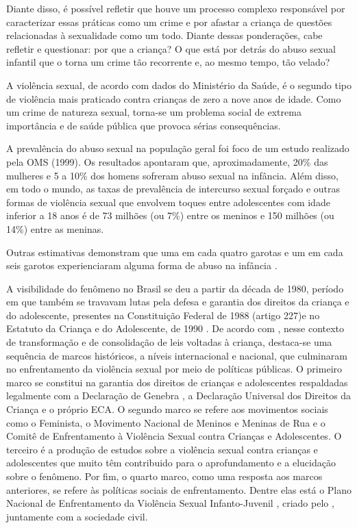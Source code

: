 Diante disso, é possível refletir que houve um processo complexo responsável por caracterizar essas práticas como um crime e por afastar a criança de questões relacionadas à sexualidade como um todo. Diante dessas ponderações, cabe refletir e questionar: por que a criança? O que está por detrás do abuso sexual infantil que o torna um crime tão recorrente e, ao mesmo tempo, tão velado?

A violência sexual, de acordo com dados do Ministério da Saúde, é o segundo tipo de violência mais praticado contra crianças de zero a nove anos de idade. Como um crime de natureza sexual, torna-se um problema social de extrema importância e de saúde pública que provoca sérias consequências.

\begin{citacao}
	A prevalência do abuso sexual na população geral foi foco de um estudo realizado pela OMS (1999). Os resultados apontaram que, aproximadamente, 20\% das mulheres e 5 a 10\% dos homens sofreram abuso sexual na infância. Além disso, em todo o mundo, as taxas de prevalência de intercurso sexual forçado e outras formas de violência sexual que envolvem toques entre adolescentes com idade inferior a 18 anos é de 73 milhões (ou 7\%) entre os meninos e 150 milhões (ou 14\%) entre as meninas. \cite[p. 69]{HABIGZANG2012}
\end{citacao}

Outras estimativas demonstram que uma em cada quatro garotas e um em cada seis garotos experienciaram alguma forma de abuso na infância .

A visibilidade do fenômeno no Brasil se deu a partir da década de 1980, período em que também se travavam lutas pela defesa e garantia dos direitos da criança e do adolescente, presentes na Constituição Federal de 1988 (artigo 227)\footnotemark e no Estatuto da Criança e do Adolescente, de 1990 . De acordo com , nesse contexto de transformação e de consolidação de leis voltadas à criança, destaca-se uma sequência de marcos históricos, a níveis internacional e nacional, que culminaram no enfrentamento da violência sexual por meio de políticas públicas. O primeiro marco se constitui na garantia dos direitos de crianças e adolescentes respaldadas legalmente com a  Declaração de Genebra \citeyear{ISTCA1924}, a Declaração Universal dos Direitos da Criança \citeyear{ONU1959} e o próprio ECA. O segundo marco se refere aos movimentos sociais como o Feminista, o Movimento Nacional de Meninos e Meninas de Rua e o Comitê de Enfrentamento à Violência Sexual contra Crianças e Adolescentes. O terceiro é a produção de estudos sobre a violência sexual contra crianças e adolescentes que muito têm contribuido para o aprofundamento e a elucidação sobre o fenômeno. Por fim, o quarto marco, como uma resposta aos marcos anteriores, se refere às políticas sociais de enfrentamento. Dentre elas está o Plano Nacional de Enfrentamento da Violência Sexual Infanto-Juvenil \citeyear{MJ2001}, criado pelo \citeauthor{MJ2001}, juntamente com a sociedade civil. 

